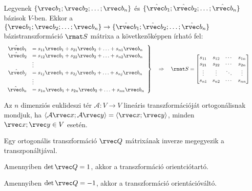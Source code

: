 \documentclass[a4paper, 12pt]{scrartcl}
\begin{document}
\begin{definition}[Bázistranszformáció]
  Legyenek $\{ \rvec b_1; \rvec b_2; \ldots; \rvec b_n \}$ és
  $\{ \hat{\rvec b}_1; \hat{\rvec b}_2; \ldots; \hat{\rvec b}_n \}$ bázisok
  $V$-ben. Ekkor a $\{ \rvec b_1; \rvec b_2; \ldots; \rvec b_n \} \rightarrow
    \{ \hat{\rvec b}_1; \hat{\rvec b}_2; \ldots; \hat{\rvec b}_n \}$
  bázistranszformáció $\rmat S$ mátrixa a következőképpen írható fel:
  $$
    \left.\begin{array}{rl}
      \hat{\rvec b}_1 & = s_{11} \rvec b_1 + s_{21} \rvec b_2 + \ldots + s_{n1} \rvec b_n \\
      \hat{\rvec b}_2 & = s_{12} \rvec b_1 + s_{22} \rvec b_2 + \ldots + s_{n2} \rvec b_n \\
                      & \vdots                                                            \\
      \hat{\rvec b}_j & = s_{1j} \rvec b_1 + s_{2j} \rvec b_2 + \ldots + s_{nj} \rvec b_n \\
                      & \vdots                                                            \\
      \hat{\rvec b}_n & = s_{1n} \rvec b_1 + s_{2n} \rvec b_2 + \ldots + s_{nn} \rvec b_n
    \end{array}\right\}
    \quad\Rightarrow\quad
    \rmat S = \begin{bmatrix}
      s_{11} & s_{12} & \cdots & s_{1n} \\
      s_{21} & s_{22} & \cdots & s_{2n} \\
      \vdots & \vdots & \ddots & \vdots \\
      s_{n1} & s_{n2} & \cdots & s_{nn}
    \end{bmatrix}
  $$
\end{definition}

\begin{definition}
  Az $n$ dimenziós  euklideszi tér $\mathcal A: V \rightarrow V$ lineáris
  transzformációját ortogonálisnak mondjuk, ha $\langle \mathcal A \rvec x;
    \mathcal A \rvec y \rangle = \langle \rvec x; \rvec y \rangle$, minden $\rvec
    x; \rvec y \in V$ esetén.
\end{definition}

\begin{note}
  Egy ortogonális transzformáció $\rvec Q$ mátrixának inverze megegyezik a
  transzponáltjával.

  Amennyiben $\det \rvec Q = 1$, akkor a transzformáció orientciótartó.

  Amennyiben $\det \rvec Q = -1$, akkor a transzformáció orientációváltó.
\end{note}
\end{document}
